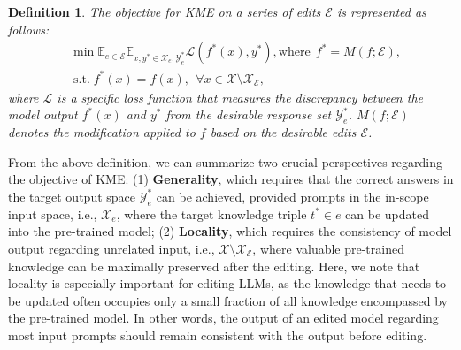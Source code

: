\documentclass[acmsmall, screen]{acmart}
\newtheorem{definition}{Definition}
\def \st{\;\text{s.t.}\;}
\begin{document}
\begin{definition}
    The objective for KME on a series of edits $\mathcal{E}$ is represented as follows:
    \begin{equation}   
    \begin{aligned}
            & \min \mathbb{E}_{e \in \mathcal{E}} \mathbb{E}_{x, y^{*} \in \mathcal{X}_e, \mathcal{Y}^*_e} \mathcal{L} (f^*(x), y^{*}), \text{where}\ \  f^*=M(f; \mathcal{E}),\\
        &\st f^*(x)=f(x),\ \  \forall x\in \mathcal{X}\setminus \mathcal{X}_\mathcal{E},
    \end{aligned}
    \label{def:general}
    \end{equation}
where $\mathcal{L}$ is a specific loss function that measures the discrepancy between the model output $f^*(x)$ and $y^*$ from the desirable response set $\mathcal{Y}^*_e$. $M(f;\mathcal{E})$ denotes the modification applied to $f$ based on the desirable edits $\mathcal{E}$.
\end{definition}
From the above definition, we can summarize two crucial perspectives regarding the objective of KME: (1) \textbf{Generality}, which requires that the correct answers in the target output space $\mathcal{Y}^*_e$ can be achieved, provided prompts in the in-scope input space, i.e., $\mathcal{X}_e$, where the target knowledge triple $t^{*} \in e$ can be updated into the pre-trained model; (2) \textbf{Locality}, which requires the consistency of model output regarding unrelated input, i.e., $\mathcal{X}\setminus\mathcal{X}_\mathcal{E}$, where valuable pre-trained knowledge can be maximally preserved after the editing. Here, we note that locality is especially important for editing LLMs, as the knowledge that needs to be updated often occupies only a small fraction of all knowledge encompassed by the pre-trained model. In other words, the output of an edited model regarding most input prompts should remain consistent with the output before editing. 

\end{document}
